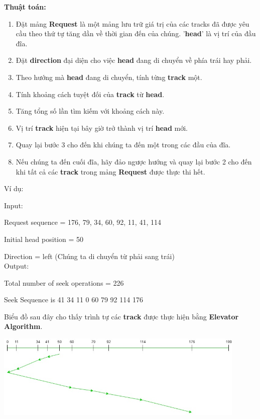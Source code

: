 \documentclass{report}
\begin{document}
    \textbf{Thuật toán:} 

    \begin{enumerate}
        \item 
            Đặt mảng \textbf{Request} là một mảng lưu trữ giá trị của các tracks đã được yêu cầu theo thứ tự tăng dần về thời gian đến của chúng. '\textbf{head}' là vị trí của đầu đĩa.
        \item 
            Đặt \textbf{direction} đại diện cho việc \textbf{head} đang di chuyển về phía trái hay phải.
        \item 
            Theo hướng mà \textbf{head} đang di chuyển, tính từng \textbf{track} một.
        \item 
            Tính khoảng cách tuyệt đối của \textbf{track} từ \textbf{head}.
        \item 
            Tăng tổng số lần tìm kiếm với khoảng cách này.
        \item 
            Vị trí \textbf{track} hiện tại bây giờ trở thành vị trí \textbf{head} mới.
        \item 
            Quay lại bước 3 cho đến khi chúng ta đến một trong các đầu của đĩa.
        \item  
            Nếu chúng ta đến cuối đĩa, hãy đảo ngược hướng và quay lại bước 2 cho đến khi tất cả các \textbf{track} trong mảng \textbf{Request} được thực thi hết.
            
    \end{enumerate}

    Ví dụ:

    \begin{tcolorbox}
    
        Input: 
        
        Request sequence = {176, 79, 34, 60, 92, 11, 41, 114}
        
        Initial head position = 50

        Direction = left (Chúng ta di chuyển từ phải sang trái)\\

        Output:

        Total number of seek operations = 226

        Seek Sequence is 41 34 11 0 60 79 92 114 176
    \end{tcolorbox} 

    Biểu đồ sau đây cho thấy trình tự các \textbf{track} được thực hiện bằng \textbf{Elevator Algorithm}. 

    \includegraphics[width = 12cm]{images/elevator/ele-1.jpg}
\end{document}

